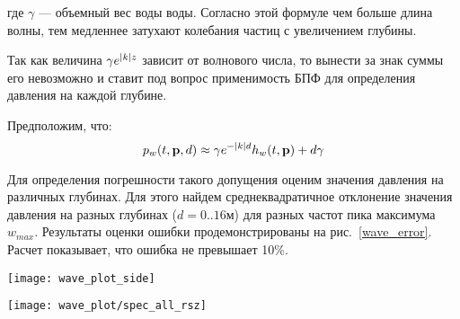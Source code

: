 где $\gamma$ --- объемный вес воды воды. Согласно этой формуле чем больше длина волны, тем медленнее затухают колебания частиц с увеличением глубины.

Так как величина $\gamma e^{\lvert k\rvert z}$ зависит от волнового числа, то вынести за знак суммы его невозможно и ставит под вопрос применимость БПФ для определения давления на каждой глубине.

Предположим, что:
\begin{equation}
\label{wave_height}
	p_w(t,\mathbf{p},d) \approx
		\gamma e^{-\lvert k\rvert d} h_w(t,\mathbf{p}) + d \gamma
\end{equation}

Для определения погрешности такого допущения оценим значения давления на различных глубинах.
Для этого найдем среднеквадратичное отклонение значения давления на разных глубинах ($d=0..16 \text{м}$) для разных частот пика максимума $w_{max}$. Результаты оценки ошибки продемонстрированы на рис.~\ref{wave_error}. Расчет показывает, что ошибка не превышает 10\%. 

\begin{sidewaysfigure}
	\texttt{[image: wave\_plot\_side]}
	\caption{Оценка ошибки расчета давления приближенным способом: (a) --- профиль поверхностей равного давления при точном расчете; (б) --- профиль поверхностей равного давления при приближенном расчете; (в) --- стандартное отклонение ошибки расчета давления на разных глубинах, для разных частот пика максимума; (г) --- относительная ошибка расчета давления на разных глубинах, для разных частот пика максимума.}
	\label{wave_error}
\end{sidewaysfigure}



\begin{sidewaysfigure}
\begin{center}
	\texttt{[image: wave\_plot/spec\_all\_rsz]}
\end{center}
\caption{Планшеты ядра БПФ и карт высот морского волнения для различных значение параметра формы углового распределения}
\label{waveplot}
\end{sidewaysfigure}


